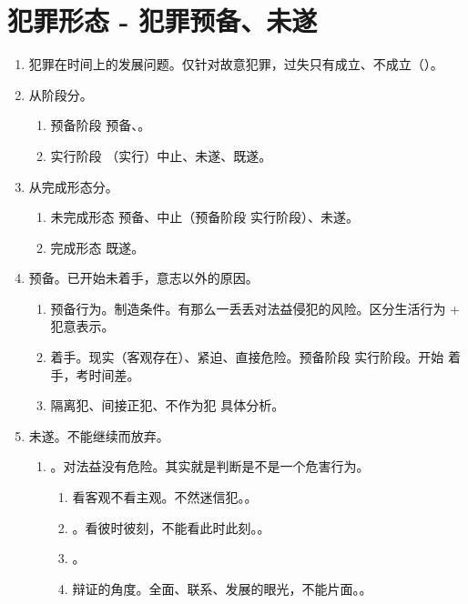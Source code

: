 \section{犯罪形态 - 犯罪预备、未遂}
\begin{enumerate}
  \item 犯罪在时间上的发展问题。仅针对故意犯罪，过失只有成立、不成立（）。
  \item 从阶段分。
        \begin{enumerate}
          \item 预备阶段 \yjt 预备、。
          \item 实行阶段 \yjt（实行）中止、未遂、既遂。
        \end{enumerate}
  \item 从完成形态分。
        \begin{enumerate}
          \item 未完成形态 \yjt 预备、中止（预备阶段 \hz 实行阶段）、未遂。
          \item 完成形态 \yjt 既遂。
        \end{enumerate}
  \item 预备。已开始未着手，意志以外的原因。
        \begin{enumerate}
          \item 预备行为。制造条件。有那么一丢丢对法益侵犯的风险。区分生活行为 + 犯意表示。
          \item 着手。现实（客观存在）、紧迫、直接危险。预备阶段 \yjt 实行阶段。开始 \bdy 着手，考时间差。
          \item 隔离犯、间接正犯、不作为犯 \yjt 具体分析。
        \end{enumerate}
  \item 未遂。不能继续而放弃。
        \begin{enumerate}
          \item {}。对法益没有危险。其实就是判断是不是一个危害行为。
                \begin{enumerate}
                  \item 看客观不看主观。不然迷信犯。。
                  \item {}。看彼时彼刻，不能看此时此刻。。
                  \item {}。
                  \item 辩证的角度。全面、联系、发展的眼光，不能片面。。
                \end{enumerate}
        \end{enumerate}
\end{enumerate}
